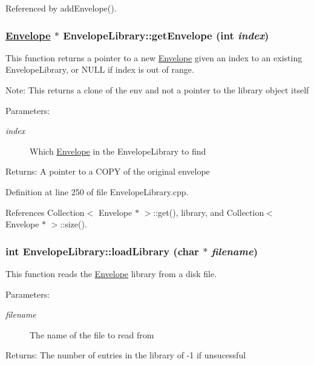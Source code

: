 Referenced by add\-Envelope().\hypertarget{classEnvelopeLibrary_a6}{
\subsubsection[getEnvelope]{\setlength{\rightskip}{0pt plus 5cm}\hyperlink{classEnvelope}{Envelope} $\ast$ Envelope\-Library::get\-Envelope (int {\em index})}}
\label{classEnvelopeLibrary_a6}


This function returns a pointer to a new \hyperlink{classEnvelope}{Envelope} given an index to an existing Envelope\-Library, or NULL if index is out of range. \begin{Desc}
\item[Note:]This returns a clone of the env and not a pointer to the library object itself \end{Desc}
\begin{Desc}
\item[Parameters:]
\begin{description}
\item[{\em index}]Which \hyperlink{classEnvelope}{Envelope} in the Envelope\-Library to find \end{description}
\end{Desc}
\begin{Desc}
\item[Returns:]A pointer to a COPY of the original envelope \end{Desc}


Definition at line 250 of file Envelope\-Library.cpp.

References Collection$<$ Envelope $\ast$ $>$::get(), library, and Collection$<$ Envelope $\ast$ $>$::size().\hypertarget{classEnvelopeLibrary_a5}{
\subsubsection[loadLibrary]{\setlength{\rightskip}{0pt plus 5cm}int Envelope\-Library::load\-Library (char $\ast$ {\em filename})}}
\label{classEnvelopeLibrary_a5}


This function reads the \hyperlink{classEnvelope}{Envelope} library from a disk file. \begin{Desc}
\item[Parameters:]
\begin{description}
\item[{\em filename}]The name of the file to read from \end{description}
\end{Desc}
\begin{Desc}
\item[Returns:]The number of entries in the library of -1 if unsucessful \end{Desc}


